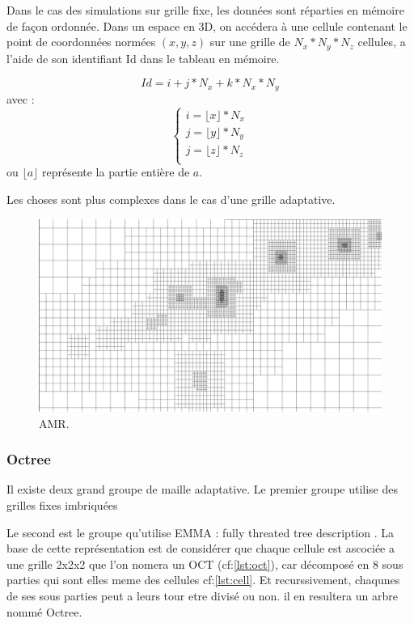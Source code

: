 Dans le cas des simulations sur grille fixe, les données sont réparties en mémoire de façon ordonnée.
Dans un espace en 3D, on accédera à une cellule contenant le point de coordonnées normées $(x,y,z)$ sur une grille de $N_x*N_y*N_z$ cellules, a l'aide de son identifiant Id dans le tableau en mémoire.

\begin{equation}
Id = i + j*N_x + k * N_x*N_y
\end{equation}
avec :
\begin{equation}
\begin{cases}
i=\lfloor x \rfloor *N_x \\
j=\lfloor y \rfloor*N_y \\
j=\lfloor z \rfloor*N_z \\
\end{cases}
\end{equation}
ou $\lfloor a \rfloor$ représente la partie entière de $a$.

Les choses sont plus complexes dans le cas d'une grille adaptative.

\begin{figure}[bth]
        \includegraphics[width=.95\linewidth]{img/02/AMR.pdf} 
        \caption{AMR. 
}
 		\label{fig:AMR}
\end{figure}

\subsubsection{Octree}

Il existe deux grand groupe de maille adaptative.
Le premier groupe utilise des grilles fixes imbriquées %

Le second est le groupe qu'utilise EMMA : fully threated tree description \citep{khokhlov_fully_1998-1}.
La base de cette représentation est de considérer que chaque cellule est ascociée a une grille 2x2x2 que l'on nomera un OCT (cf:\ref{lst:oct}), car décomposé en 8 sous parties  qui sont elles meme des cellules cf:\ref{lst:cell}.
Et recurssivement, chaqunes de ses sous parties peut a leurs tour etre divisé ou non.
il en resultera un arbre nommé Octree.

